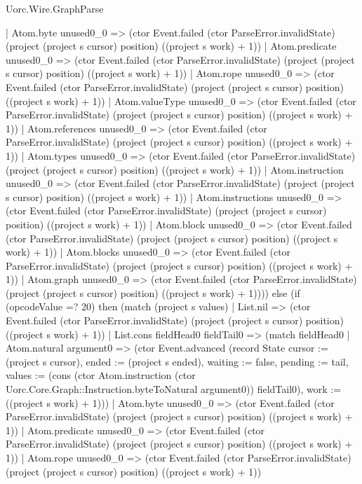 \begin{lexlean}{Uorc.Wire.GraphParse}
\begin{semanticmodule}
{          | Atom.byte unused0_0 => (ctor Event.failed (ctor ParseError.invalidState) (project (project s cursor) position) ((project s work) + 1))
          | Atom.predicate unused0_0 => (ctor Event.failed (ctor ParseError.invalidState) (project (project s cursor) position) ((project s work) + 1))
          | Atom.rope unused0_0 => (ctor Event.failed (ctor ParseError.invalidState) (project (project s cursor) position) ((project s work) + 1))
          | Atom.valueType unused0_0 => (ctor Event.failed (ctor ParseError.invalidState) (project (project s cursor) position) ((project s work) + 1))
          | Atom.references unused0_0 => (ctor Event.failed (ctor ParseError.invalidState) (project (project s cursor) position) ((project s work) + 1))
          | Atom.types unused0_0 => (ctor Event.failed (ctor ParseError.invalidState) (project (project s cursor) position) ((project s work) + 1))
          | Atom.instruction unused0_0 => (ctor Event.failed (ctor ParseError.invalidState) (project (project s cursor) position) ((project s work) + 1))
          | Atom.instructions unused0_0 => (ctor Event.failed (ctor ParseError.invalidState) (project (project s cursor) position) ((project s work) + 1))
          | Atom.block unused0_0 => (ctor Event.failed (ctor ParseError.invalidState) (project (project s cursor) position) ((project s work) + 1))
          | Atom.blocks unused0_0 => (ctor Event.failed (ctor ParseError.invalidState) (project (project s cursor) position) ((project s work) + 1))
          | Atom.graph unused0_0 => (ctor Event.failed (ctor ParseError.invalidState) (project (project s cursor) position) ((project s work) + 1)))) else (if (opcodeValue =? 20) then (match (project s values)
        | List.nil => (ctor Event.failed (ctor ParseError.invalidState) (project (project s cursor) position) ((project s work) + 1))
        | List.cons fieldHead0 fieldTail0 => (match fieldHead0
          | Atom.natural argument0 => (ctor Event.advanced (record State {cursor := (project s cursor), ended := (project s ended), waiting := false, pending := tail, values := (cons (ctor Atom.instruction (ctor Uorc.Core.Graph::Instruction.byteToNatural argument0)) fieldTail0), work := ((project s work) + 1)}))
          | Atom.byte unused0_0 => (ctor Event.failed (ctor ParseError.invalidState) (project (project s cursor) position) ((project s work) + 1))
          | Atom.predicate unused0_0 => (ctor Event.failed (ctor ParseError.invalidState) (project (project s cursor) position) ((project s work) + 1))
          | Atom.rope unused0_0 => (ctor Event.failed (ctor ParseError.invalidState) (project (project s cursor) position) ((project s work) + 1))
}
\end{semanticmodule}
\end{lexlean}
